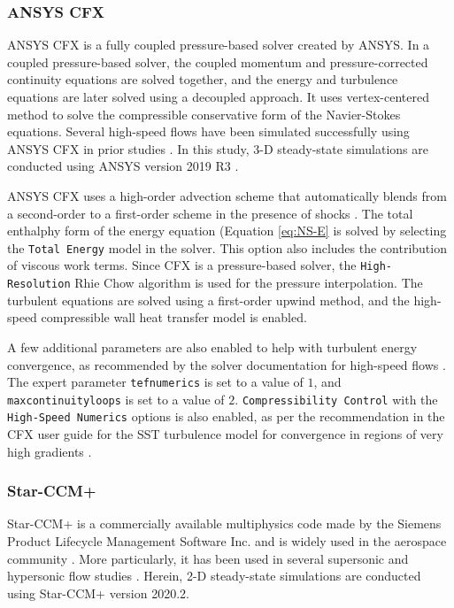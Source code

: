 \documentclass[journal ]{new-aiaa}
\begin{document}

\subsubsection{ANSYS CFX}
ANSYS CFX is a fully coupled pressure-based solver created by ANSYS. In a coupled pressure-based solver, the coupled momentum and pressure-corrected continuity equations are solved together, and the energy and turbulence equations are later solved using a decoupled approach. It uses vertex-centered method to solve the compressible conservative form of the Navier-Stokes equations. Several high-speed flows have been simulated successfully using ANSYS CFX in prior studies \cite{Isaev2009, Ekanayake2013}. In this study, 3-D steady-state simulations are conducted using ANSYS version 2019 R3 \cite{Ansys_userguide}. 

ANSYS CFX uses a high-order advection scheme that automatically blends from a second-order to a first-order scheme in the presence of shocks \cite{Ansys_userguide}. The total enthalphy form of the energy equation (Equation \ref{eq:NS-E} is solved by selecting the \texttt{Total Energy} model in the solver. This option also includes the contribution of viscous work terms. Since CFX is a pressure-based solver, the \texttt{High-Resolution} Rhie Chow algorithm is used for the pressure interpolation. The turbulent equations are solved using a first-order upwind method, and the high-speed compressible wall heat transfer model is enabled. 

A few additional parameters are also enabled to help with turbulent energy convergence, as recommended by the solver documentation for high-speed flows \cite{Ansys_userguide}. The expert parameter \texttt{tefnumerics} is set to a value of $1$, and \texttt{maxcontinuityloops} is set to a value of $2$. \texttt{Compressibility Control} with the \texttt{High-Speed Numerics} options is also enabled, as per the recommendation in the CFX user guide for the SST turbulence model for convergence in regions of very high gradients \cite{Ansys_userguide}.


\subsubsection{Star-CCM+}
Star-CCM+ is a commercially available multiphysics code made by the Siemens Product Lifecycle Management Software Inc. and is widely used in the aerospace community \cite{SiemensPLM}. More particularly, it has been used in several supersonic and hypersonic flow studies \cite{Shellabarger2018, Comstock2020, Cross2019}. Herein, 2-D steady-state simulations are conducted using Star-CCM+ version 2020.2.
\end{document}
